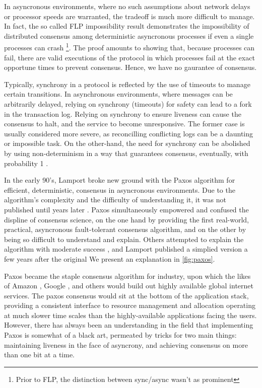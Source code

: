In asyncronous environments, where no such assumptions about network delays or processor speeds are warranted,
the tradeoff is much more difficult to manage.
In fact, the so called FLP impossibility result demonstrates the impossibility of distributed consensus among deterministic asyncronous processes if even a single processes can crash 
\footnote{Prior to FLP, the distinction between sync/async wasn't as prominent}.
The proof amounts to showing that, because processes can fail, 
there are valid executions of the protocol in which processes fail at the exact opportune times to prevent consensus.
Hence, we have no gaurantee of consensus.

Typically, synchrony in a protocol is reflected by the use of timeouts to manage certain transitions.
In asynchronous environments, where messages can be arbitrarily delayed, relying on synchrony (timeouts) for safety
can lead to a fork in the transaction log.
Relying on synchrony to ensure liveness can cause the consensus to halt, and the service to become unresponsive.
The former case is usually considered more severe, as reconcilling conflicting logs can be a daunting or impossible task. 
On the other-hand, the need for synchrony can be abolished by using non-determinism in a way that guarantees consensus, eventually, with probability 1 \cite{}.

In the early 90's, Lamport broke new ground with the Paxos algorithm for efficient, deterministic, consensus in asyncronous environments.
Due to the algorithm's complexity and the difficulty of understanding it, it was not published until years later \cite{paxos}.
Paxos simultaneously empowered and confused the displine of consensus science,
on the one hand by providing the first real-world, practical, asyncronous fault-tolerant consensus algorithm,
and on the other by being so difficult to understand and explain.
Others attempted to explain the algorithm with moderate success \cite{}, and Lamport published a simplied version 
a few years after the original \cite{}
We present an explanation in \ref{fig:paxos}.

Paxos became the staple consensus algorithm for industry, upon which the likes of Amazon \cite{dynamo}, Google \cite{chubby}, and others would build out highly available global internet services.
The paxos consensus would sit at the bottom of the application stack, providing a consistent interface to resource management and allocation operating at much slower time scales than the highly-available applications facing the users.
However, there has always been an understanding in the field that implementing Paxos is somewhat of a black art,
permeated by tricks for two main things: maintaining liveness in the face of asyncrony, and achieving consensus on more than one bit at a time.

